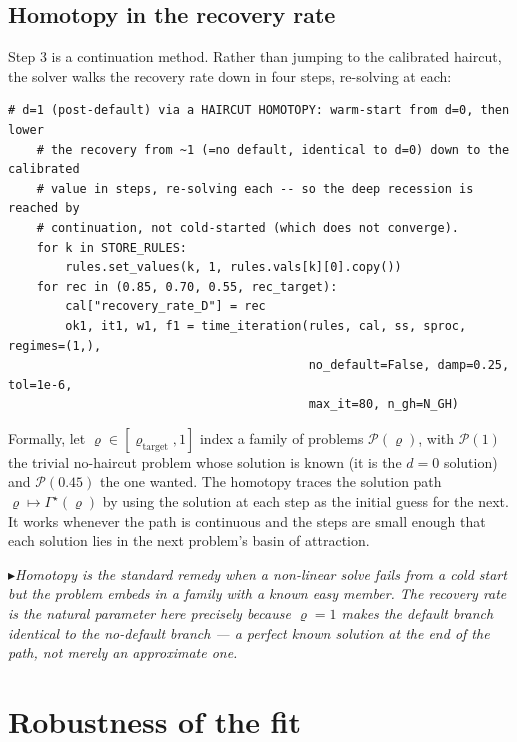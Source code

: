 \documentclass[11pt]{article}
\numberwithin{equation}{section}
\newcommand{\code}[1]{\texttt{\small #1}}
\theoremstyle{definition}
\theoremstyle{plain}
\theoremstyle{remark}
\newcommand{\trick}[1]{\par\smallskip\noindent
  \textcolor{notec}{$\blacktriangleright$}\;\emph{#1}\par\smallskip}
\begin{document}
\subsection{Homotopy in the recovery rate}

Step 3 is a continuation method. Rather than jumping to the calibrated haircut, the
solver walks the recovery rate down in four steps, re-solving at each:

\begin{lstlisting}[caption={Haircut homotopy. \code{recursive\_experiment.py}, \code{solve\_recursive}.}]
    # d=1 (post-default) via a HAIRCUT HOMOTOPY: warm-start from d=0, then lower
    # the recovery from ~1 (=no default, identical to d=0) down to the calibrated
    # value in steps, re-solving each -- so the deep recession is reached by
    # continuation, not cold-started (which does not converge).
    for k in STORE_RULES:
        rules.set_values(k, 1, rules.vals[k][0].copy())
    for rec in (0.85, 0.70, 0.55, rec_target):
        cal["recovery_rate_D"] = rec
        ok1, it1, w1, f1 = time_iteration(rules, cal, ss, sproc, regimes=(1,),
                                          no_default=False, damp=0.25, tol=1e-6,
                                          max_it=80, n_gh=N_GH)
\end{lstlisting}

Formally, let $\varrho\in[\varrho_{\text{target}},1]$ index a family of problems
$\mathcal{P}(\varrho)$, with $\mathcal{P}(1)$ the trivial no-haircut problem whose
solution is known (it is the $d=0$ solution) and $\mathcal{P}(0.45)$ the one wanted.
The homotopy traces the solution path
$\varrho\mapsto\Gamma^{\star}(\varrho)$ by using the solution at each step as the
initial guess for the next. It works whenever the path is continuous and the steps
are small enough that each solution lies in the next problem's basin of attraction.

\trick{Homotopy is the standard remedy when a non-linear solve fails from a cold
start but the problem embeds in a family with a known easy member. The recovery rate
is the natural parameter here precisely because $\varrho=1$ makes the default branch
\emph{identical} to the no-default branch --- a perfect known solution at the end of
the path, not merely an approximate one.}

\section{Robustness of the fit}
\label{sec:masking}
\end{document}
